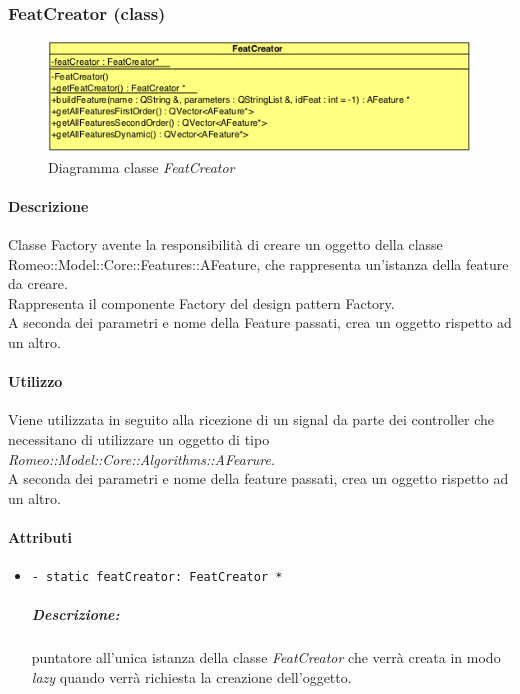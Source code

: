 \subsubsection{FeatCreator (class)}
\label{FeatCreator}
\begin{figure}[!h]
\centering
			\includegraphics[scale=1]{./Content/Immagini/modelCore/FeatCreator.png}
			\caption{Diagramma classe \textsl{FeatCreator}}
			\label{FeatCreator_img}
\end{figure}

\paragraph{Descrizione \\}
Classe Factory avente la responsibilità di creare un oggetto della classe Romeo::Model::Core::Features::AFeature, che rappresenta un'istanza della feature\glossario{} da creare.
\\Rappresenta il componente Factory del design pattern\g{} Factory.
\\A seconda dei parametri e nome della Feature\g{} passati, crea un oggetto rispetto ad un altro.

\paragraph{Utilizzo \\}
Viene utilizzata in seguito alla ricezione di un signal\g{} da parte dei controller che necessitano di utilizzare un oggetto di tipo \textsl{Romeo::Model::Core::Algorithms::AFearure}.
\\A seconda dei parametri e nome della feature\g{} passati, crea un oggetto rispetto ad un altro.

\paragraph{Attributi}
	\begin{itemize}
		\item \color{teal}\verb!- static featCreator: FeatCreator *!
			\color{black}
			\subparagraph{Descrizione:} puntatore all'unica istanza della classe \textsl{FeatCreator} che verrà creata in modo \textit{lazy} quando verrà richiesta la creazione dell'oggetto.
			
	\end{itemize}
	
